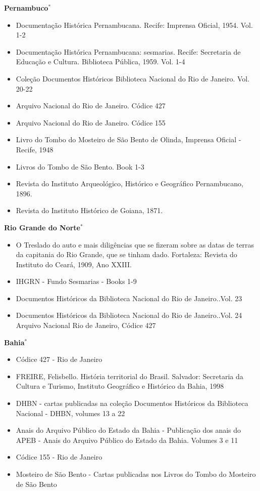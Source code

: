 \documentclass[11pt]{article}
\begin{document}
\textbf{Pernambuco$^*$}
\begin{itemize}
\item Documentação Histórica Pernambucana. Recife: Imprensa Oficial, 1954. Vol. 1-2
\item Documentação Histórica Pernambucana: sesmarias. Recife: Secretaria de Educação e Cultura. Biblioteca Pública, 1959. Vol. 1-4
\item Coleção Documentos Históricos Biblioteca Nacional do Rio de Janeiro. Vol. 20-22
\item Arquivo Nacional do Rio de Janeiro. Códice 427
\item Arquivo Nacional do Rio de Janeiro. Códice 155
\item Livro do Tombo do Mosteiro de São Bento de Olinda, Imprensa Oficial - Recife, 1948
\item Livros do Tombo de São Bento. Book 1-3
\item Revista do Instituto Arqueológico, Histórico e Geográfico Pernambucano, 1896.
\item Revista do Instituto Histórico de Goiana, 1871.
\end{itemize}

\textbf{Rio Grande do Norte$^*$}
\begin{itemize}
  \item O Treslado do auto e mais diligências que se fizeram sobre as datas de terras da capitania do Rio Grande, que se tinham dado. Fortaleza: Revista do Instituto do Ceará, 1909, Ano XXIII.
  \item IHGRN - Fundo Sesmarias - Books 1-9
  \item Documentos Históricos da Biblioteca Nacional do Rio de Janeiro..Vol. 23
  \item Documentos Históricos da Biblioteca Nacional do Rio de Janeiro..Vol. 24 Arquivo Nacional Rio de Janeiro, Códice 427
\end{itemize}

\begin{comment}
\textbf{Ceara}
\begin{itemize}
  \item 
\end{itemize}
\end{comment}

\textbf{Bahia$^*$}
\begin{itemize}
  \item Códice 427 - Rio de Janeiro
  \item FREIRE, Felisbello. História territorial do Brasil. Salvador: Secretaria da Cultura e Turismo, Instituto Geográfico e Histórico da Bahia, 1998
  \item DHBN - cartas publicadas na coleção Documentos Históricos da Biblioteca Nacional - DHBN, volumes 13 a 22
  \item  Anais do Arquivo Público do Estado da Bahia - Publicação dos anais do APEB - Anais do Arquivo Público do Estado da Bahia. Volumes 3 e 11
  \item Códice 155 - Rio de Janeiro
  \item Mosteiro de São Bento - Cartas publicadas nos Livros do Tombo do Mosteiro de São Bento  
\end{itemize}
\end{document}

